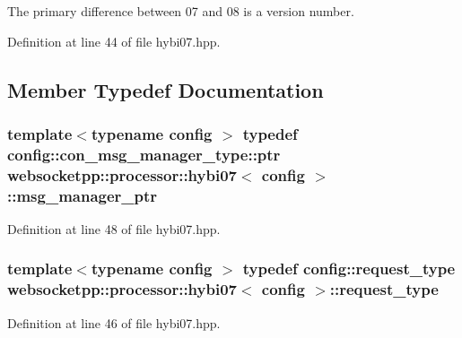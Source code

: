 The primary difference between 07 and 08 is a version number. 

Definition at line 44 of file hybi07.\+hpp.



\subsection{Member Typedef Documentation}
\hypertarget{classwebsocketpp_1_1processor_1_1hybi07_abfa0723364d644f3320141ade624fc8e}{}
\subsubsection[{msg\+\_\+manager\+\_\+ptr}]{\setlength{\rightskip}{0pt plus 5cm}template$<$typename config $>$ typedef config\+::con\+\_\+msg\+\_\+manager\+\_\+type\+::ptr {\bf websocketpp\+::processor\+::hybi07}$<$ config $>$\+::{\bf msg\+\_\+manager\+\_\+ptr}}\label{classwebsocketpp_1_1processor_1_1hybi07_abfa0723364d644f3320141ade624fc8e}


Definition at line 48 of file hybi07.\+hpp.

\hypertarget{classwebsocketpp_1_1processor_1_1hybi07_ae8e3aeed4b4d6d67c8af5dccf70d468d}{}
\subsubsection[{request\+\_\+type}]{\setlength{\rightskip}{0pt plus 5cm}template$<$typename config $>$ typedef config\+::request\+\_\+type {\bf websocketpp\+::processor\+::hybi07}$<$ config $>$\+::{\bf request\+\_\+type}}\label{classwebsocketpp_1_1processor_1_1hybi07_ae8e3aeed4b4d6d67c8af5dccf70d468d}


Definition at line 46 of file hybi07.\+hpp.

\hypertarget{classwebsocketpp_1_1processor_1_1hybi07_afb0db8323385a430df83372ce5b29bc2}{}
